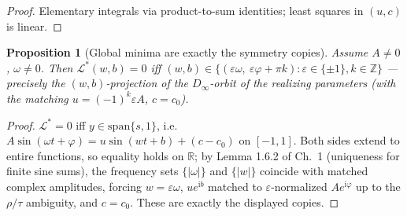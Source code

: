 \documentclass[11pt]{article}
\newtheorem{proposition}[theorem]{Proposition}
\newcommand{\R}{\mathbb{R}}
\newcommand{\Z}{\mathbb{Z}}
\begin{document}
\begin{proof} Elementary integrals via product-to-sum identities; least squares in $(u,c)$ is
linear. \end{proof}

\begin{proposition}[Global minima are exactly the symmetry copies]\label{prop:zeroset}
Assume $A\ne0$, $\omega\ne0$. Then $\mathcal L^*(w,b)=0$ iff
$(w,b)\in\{(\varepsilon\omega,\ \varepsilon\varphi+\pi k):\varepsilon\in\{\pm1\},k\in\Z\}$ —
precisely the $(w,b)$-projection of the $D_\infty$-orbit of the realizing parameters (with the
matching $u=(-1)^k\varepsilon A$, $c=c_0$).
\end{proposition}

\begin{proof}
$\mathcal L^*=0$ iff $y\in\mathrm{span}\{s,1\}$, i.e. $A\sin(\omega t+\varphi)=u\sin(wt+b)+
(c-c_0)$ on $[-1,1]$. Both sides extend to entire functions, so equality holds on $\R$; by
Lemma 1.6.2 of Ch.~1 (uniqueness for finite sine sums), the frequency sets $\{|\omega|\}$ and
$\{|w|\}$ coincide with matched complex amplitudes, forcing $w=\varepsilon\omega$,
$ue^{\mathrm i b}$ matched to $\varepsilon$-normalized $Ae^{\mathrm i\varphi}$ up to the
$\rho/\tau$ ambiguity, and $c=c_0$. These are exactly the displayed copies.
\end{proof}
\end{document}
